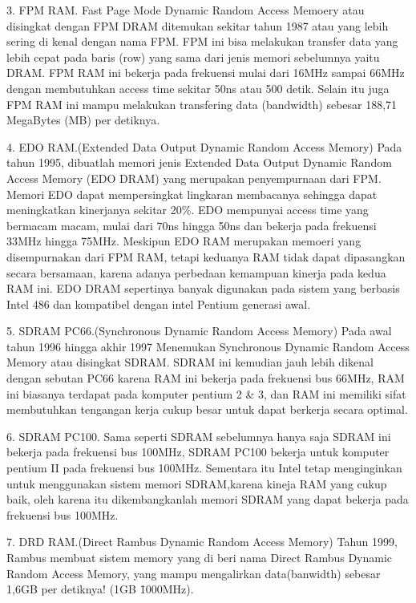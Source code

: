 3.  FPM RAM. Fast Page Mode Dynamic Random Access Memoery atau disingkat dengan FPM DRAM ditemukan sekitar tahun 1987 atau yang lebih sering di kenal dengan nama FPM. FPM ini bisa melakukan transfer data yang lebih cepat pada baris (row) yang sama dari jenis memori sebelumnya yaitu DRAM. FPM RAM ini bekerja pada frekuensi mulai dari 16MHz sampai 66MHz dengan membutuhkan access time sekitar 50ns atau 500 detik. Selain itu juga FPM RAM ini mampu melakukan transfering data (bandwidth) sebesar 188,71 MegaBytes (MB) per detiknya.

4.  EDO RAM.(Extended Data Output Dynamic Random Access Memory) Pada tahun 1995, dibuatlah memori jenis Extended Data Output Dynamic Random Access Memory (EDO DRAM) yang merupakan penyempurnaan dari FPM. Memori EDO dapat mempersingkat lingkaran membacanya sehingga dapat meningkatkan kinerjanya sekitar 20\%. EDO mempunyai access time yang bermacam macam, mulai dari 70ns hingga 50ns dan bekerja  pada frekuensi 33MHz hingga 75MHz. Meskipun EDO RAM merupakan memoeri yang disempurnakan dari FPM RAM, tetapi keduanya RAM tidak dapat dipasangkan secara bersamaan, karena adanya perbedaan kemampuan kinerja pada kedua RAM ini. EDO DRAM sepertinya banyak digunakan pada sistem yang berbasis Intel 486 dan kompatibel dengan intel Pentium generasi awal.

5.  SDRAM PC66.(Synchronous Dynamic Random Access Memory) Pada awal tahun 1996 hingga akhir 1997 Menemukan Synchronous Dynamic Random Access Memory atau disingkat SDRAM. SDRAM ini kemudian jauh lebih dikenal dengan sebutan PC66 karena RAM ini bekerja pada frekuensi bus 66MHz, RAM ini biasanya terdapat pada komputer pentium 2 \& 3, dan RAM ini memiliki sifat membutuhkan tengangan kerja cukup besar untuk dapat berkerja secara optimal.

6.  SDRAM PC100. Sama seperti SDRAM sebelumnya hanya saja SDRAM ini bekerja pada frekuensi bus 100MHz, SDRAM PC100 bekerja untuk komputer pentium II pada frekuensi bus 100MHz. Sementara itu Intel tetap menginginkan untuk menggunakan sistem memori SDRAM,karena kineja RAM yang cukup baik, oleh karena itu dikembangkanlah memori SDRAM yang dapat bekerja pada frekuensi bus 100MHz.

7.  DRD RAM.(Direct Rambus Dynamic Random Access Memory) Tahun 1999, Rambus membuat sistem memory yang di beri nama Direct Rambus Dynamic Random Access Memory, yang mampu mengalirkan data(banwidth) sebesar 1,6GB per detiknya! (1GB \= 1000MHz).

